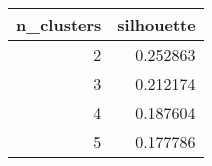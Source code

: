 \begin{tabular}{rr}
\toprule
 n\_clusters &  silhouette \\
\midrule
          2 &    0.252863 \\
          3 &    0.212174 \\
          4 &    0.187604 \\
          5 &    0.177786 \\
\bottomrule
\end{tabular}
